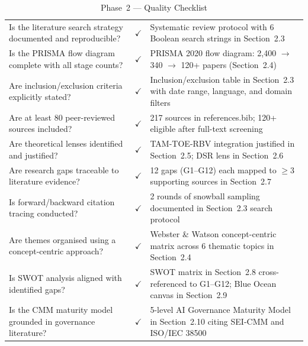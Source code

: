 \begingroup\singlespacing\tablefontsize\tablestripes
\begin{xltabular}{\textwidth}{@{} p{0.33\textwidth} c X @{}}
\caption{Phase~2 --- Quality Checklist}
\label{tab:phase2_checklist}\\
\toprule
{} &  &  \\
\midrule
\endfirsthead
\endhead
\bottomrule
\endlastfoot
Is the literature search strategy documented and reproducible?      & $\checkmark$ & Systematic review protocol with 6 Boolean search strings in Section~2.3 \\
\addlinespace
Is the PRISMA flow diagram complete with all stage counts?          & $\checkmark$ & PRISMA 2020 flow diagram: 2,400 $\rightarrow$ 340 $\rightarrow$ 120+ papers (Section~2.4) \\
\addlinespace
Are inclusion/exclusion criteria explicitly stated?                 & $\checkmark$ & Inclusion/exclusion table in Section~2.3 with date range, language, and domain filters \\
\addlinespace
Are at least 80 peer-reviewed sources included?                     & $\checkmark$ & 217 sources in references.bib; 120+ eligible after full-text screening \\
\addlinespace
Are theoretical lenses identified and justified?                    & $\checkmark$ & TAM-TOE-RBV integration justified in Section~2.5; DSR lens in Section~2.6 \\
\addlinespace
Are research gaps traceable to literature evidence?                 & $\checkmark$ & 12 gaps (G1--G12) each mapped to $\geq$3 supporting sources in Section~2.7 \\
\addlinespace
Is forward/backward citation tracing conducted?                     & $\checkmark$ & 2 rounds of snowball sampling documented in Section~2.3 search protocol \\
\addlinespace
Are themes organised using a concept-centric approach?              & $\checkmark$ & Webster \& Watson concept-centric matrix across 6 thematic topics in Section~2.4 \\
\addlinespace
Is SWOT analysis aligned with identified gaps?                      & $\checkmark$ & SWOT matrix in Section~2.8 cross-referenced to G1--G12; Blue Ocean canvas in Section~2.9 \\
\addlinespace
Is the CMM maturity model grounded in governance literature?        & $\checkmark$ & 5-level AI Governance Maturity Model in Section~2.10 citing SEI-CMM and ISO/IEC 38500 \\
\end{xltabular}
\endgroup

